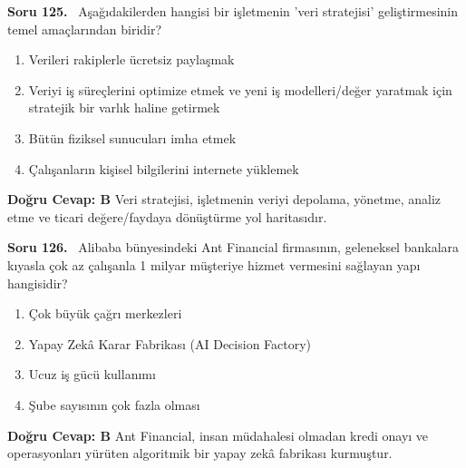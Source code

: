 \documentclass[11pt,a4paper,openany]{book}
\begin{document}
\needspace{5cm}
\vspace{8pt}
\noindent\textbf{\large\sffamily Soru 125.} \ Aşağıdakilerden hangisi bir işletmenin 'veri stratejisi' geliştirmesinin temel amaçlarından biridir?
\begin{enumerate}[label=\Alph*), leftmargin=25pt, topsep=4pt, itemsep=2pt]
    \item Verileri rakiplerle ücretsiz paylaşmak
    \item Veriyi iş süreçlerini optimize etmek ve yeni iş modelleri/değer yaratmak için stratejik bir varlık haline getirmek
    \item Bütün fiziksel sunucuları imha etmek
    \item Çalışanların kişisel bilgilerini internete yüklemek
\end{enumerate}
\vspace{4pt}
\begin{tcolorbox}[title=Cevap ve Açıklama, colback=gray!3!white, colframe=primarycolor!90!black, arc=2mm, fonttitle=\bfseries\sffamily, top=6pt, bottom=6pt]
    \textbf{Doğru Cevap: B}
    \vspace{2pt}
    Veri stratejisi, işletmenin veriyi depolama, yönetme, analiz etme ve ticari değere/faydaya dönüştürme yol haritasıdır.
\end{tcolorbox}
\vspace{10pt}

\needspace{5cm}
\vspace{8pt}
\noindent\textbf{\large\sffamily Soru 126.} \ Alibaba bünyesindeki Ant Financial firmasının, geleneksel bankalara kıyasla çok az çalışanla 1 milyar müşteriye hizmet vermesini sağlayan yapı hangisidir?
\begin{enumerate}[label=\Alph*), leftmargin=25pt, topsep=4pt, itemsep=2pt]
    \item Çok büyük çağrı merkezleri
    \item Yapay Zekâ Karar Fabrikası (AI Decision Factory)
    \item Ucuz iş gücü kullanımı
    \item Şube sayısının çok fazla olması
\end{enumerate}
\vspace{4pt}
\begin{tcolorbox}[title=Cevap ve Açıklama, colback=gray!3!white, colframe=primarycolor!90!black, arc=2mm, fonttitle=\bfseries\sffamily, top=6pt, bottom=6pt]
    \textbf{Doğru Cevap: B}
    \vspace{2pt}
    Ant Financial, insan müdahalesi olmadan kredi onayı ve operasyonları yürüten algoritmik bir yapay zekâ fabrikası kurmuştur.
\end{tcolorbox}
\vspace{10pt}
\end{document}
